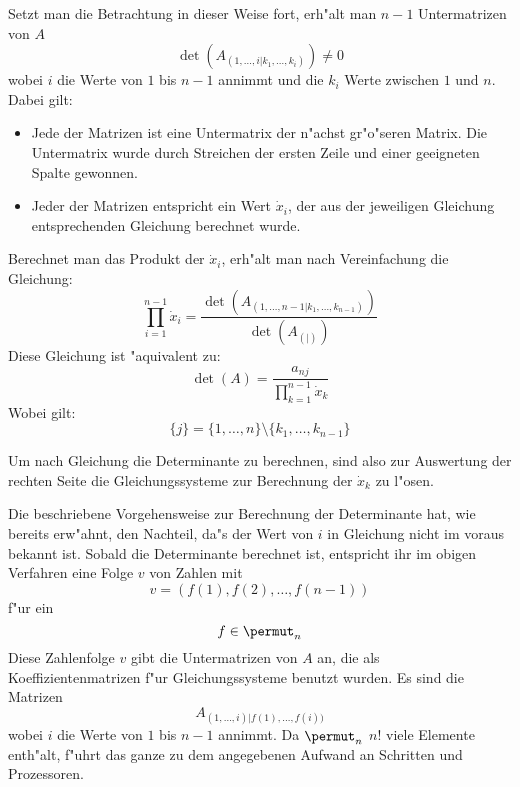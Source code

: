 \begin{beweis}
    Setzt man die Betrachtung in dieser Weise fort, erh"alt man
    $n-1$ Untermatrizen von $A$
    \[ \det(A_{(1,\ldots,i|k_1,\ldots,k_i)}) \neq 0 \]
    wobei $i$ die Werte von $1$ bis $n-1$ annimmt und die $k_i$
    Werte zwischen $1$ und $n$. Dabei gilt:
    \begin{itemize}
    \item Jede der Matrizen ist eine Untermatrix der n"achst
          gr"o"seren Matrix. Die Untermatrix wurde durch Streichen
          der ersten Zeile und einer geeigneten Spalte gewonnen.
    \item Jeder der Matrizen entspricht ein Wert $\dot{x}_i$,
          der aus der
          jeweiligen Gleichung 
          entsprechenden Gleichung berechnet wurde.
    \end{itemize}
    Berechnet man das Produkt der $ \dot{x}_i $,
    erh"alt man nach Vereinfachung die Gleichung:
    \[
        \prod_{i=1}^{n-1} \dot{x}_i =
            \frac{ \det( {A}_{ ( 1,\ldots,n-1|k_1,\ldots,k_{n-1}
                               )
                             }
                       )
                 }{
                   \det( {A}_{(|)} ) }
    \]
    Diese Gleichung ist "aquivalent zu:
    \begin{equation}
    \label{Equ2SatzDdurchG}
        \det(A)=
            \frac{ {a}_{nj} }{
                   \prod_{k=1}^{n-1} \dot{x}_k }
    \end{equation}
    Wobei gilt:
    \[ \{j\}= \{ 1,\ldots,n \} \setminus \{ k_1,\ldots,k_{n-1} \} \]

    Um nach Gleichung  die Determinante zu
    berechnen, sind also zur Auswertung der rechten Seite die
    Gleichungssysteme zur Berechnung der $\dot{x}_k$ zu l"osen.

    Die beschriebene Vorgehensweise zur Berechnung der Determinante
    hat, wie bereits erw"ahnt, den Nachteil, da"s der Wert von
    $i$ in Gleichung  nicht im voraus bekannt
    ist. Sobald die Determinante berechnet ist, entspricht ihr im
    obigen Verfahren eine Folge $v$ von Zahlen mit
    \[ v = (f(1),f(2),\ldots,f(n-1)) \]
    f"ur ein \[ f \in \permut_n \]
    Diese Zahlenfolge $v$ gibt die Untermatrizen von $A$ an, die
    als Koeffizientenmatrizen f"ur Gleichungssysteme benutzt
    wurden. Es sind die Matrizen
    \[ A_{(1,\ldots,i)|f(1),\ldots,f(i))} \]
    wobei $i$ die Werte von $1$ bis $n-1$ annimmt. Da
    $\permut_n$ $n!$ viele Elemente enth"alt, f"uhrt das ganze zu dem
    angegebenen Aufwand an Schritten und Prozessoren.
\end{beweis}

